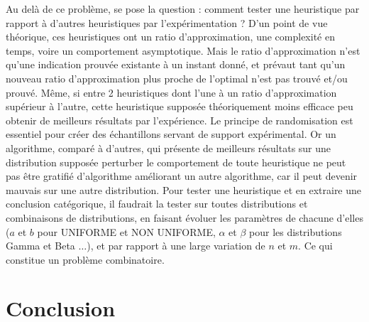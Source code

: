 \documentclass[a4paper,12pt]{report}
\theoremstyle{plain}				%
\theoremstyle{definition}				%
\begin{document}
Au delà de ce problème, se pose la question : comment tester une heuristique par rapport à d'autres heuristiques par l'expérimentation ?
D'un point de vue théorique, ces heuristiques ont un ratio d'approximation, 
  une complexité en temps, voire un comportement asymptotique. 
Mais le ratio d’approximation n’est qu'une indication prouvée existante 
  à un instant donné, et prévaut tant qu'un nouveau ratio d'approximation 
  plus proche de l'optimal n'est pas trouvé et/ou prouvé. 
Même, si entre 2 heuristiques dont l'une à un ratio d'approximation 
  supérieur à l'autre, cette heuristique supposée théoriquement moins 
  efficace peu obtenir de meilleurs résultats par l'expérience.      
Le principe de randomisation est essentiel pour créer des échantillons servant 
  de support expérimental. 
Or un algorithme, comparé à d'autres, qui présente de meilleurs résultats 
  sur une distribution supposée perturber le comportement de toute heuristique 
  ne peut pas être gratifié d'algorithme améliorant un autre algorithme, 
  car il peut devenir mauvais sur une autre distribution. 
Pour tester une heuristique et en extraire une conclusion catégorique, 
  il faudrait la tester sur toutes distributions et combinaisons 
  de distributions, en faisant évoluer les paramètres de chacune d'elles 
 ($a$ et $b$ pour UNIFORME et NON UNIFORME, $\alpha$ et $\beta$ 
  pour les distributions Gamma et Beta $\ldots$), 
  et par rapport à une large variation de $n$ et $m$.  
Ce qui constitue un problème combinatoire.


\section{Conclusion} \label{sec:conclusion}
\end{document}
